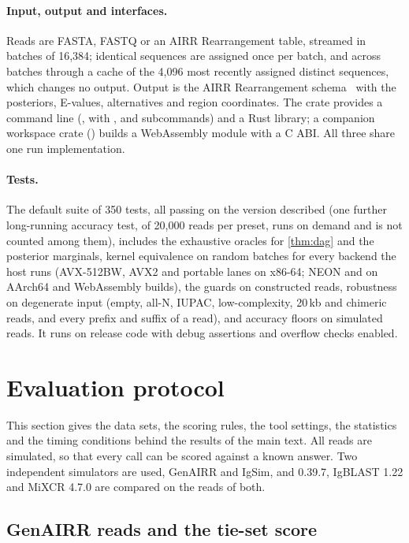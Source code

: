 \documentclass[11pt,a4paper]{article}
\begin{document}
\paragraph{Input, output and interfaces.} Reads are FASTA, FASTQ or an AIRR
Rearrangement table, streamed in batches of 16,384; identical sequences are
assigned once per batch, and across batches through a cache of the 4,096
most recently assigned distinct sequences, which changes no output. Output is
the AIRR Rearrangement schema~\cite{vanderheiden2018airr} with the
posteriors, E-values, alternatives and region coordinates. The crate provides
a command line (, with ,  and
 subcommands) and a Rust library; a companion workspace crate
() builds a WebAssembly module with a C ABI. All three share
one run implementation.

\paragraph{Tests.} The default suite of 350 tests, all passing on the
version described (one further long-running accuracy test, of 20,000 reads
per preset, runs on demand and is not counted among them), includes the exhaustive oracles for \cref{thm:dag} and the
posterior marginals, kernel equivalence on random batches for every backend
the host runs (AVX-512BW, AVX2 and portable lanes on x86-64; NEON and
 on AArch64 and WebAssembly builds), the guards on constructed
reads, robustness on
degenerate input (empty, all-N, IUPAC, low-complexity, 20\,kb and chimeric
reads, and every prefix and suffix of a read), and accuracy floors on
simulated reads. It runs on release code with debug assertions and overflow
checks enabled.

\section{Evaluation protocol}
\label{sec:protocol}

This section gives the data sets, the scoring rules, the tool settings, the
statistics and the timing conditions behind the results of the main text.
All reads are simulated, so that every call can be scored against a known
answer. Two independent simulators are used, GenAIRR and IgSim, and \swig{}
0.39.7, IgBLAST 1.22 and MiXCR 4.7.0 are compared on the reads of both.

\subsection{GenAIRR reads and the tie-set score}
\label{sec:protocol-genairr}
\end{document}
